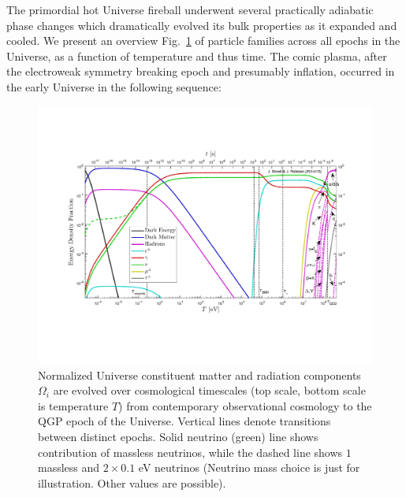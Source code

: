\documentclass[universe,article,submit,moreauthors,pdftex,a4paper]{Definitions/mdpi}
\newcommand*{\rf}[1]{Fig.~{\ref{#1}}}
\begin{document}
{The primordial hot Universe fireball underwent several practically adiabatic phase changes which dramatically evolved its bulk properties as it expanded and cooled.} We present an overview \rf{CosmicFraction} of particle families across all epochs in the Universe, as a function of temperature and thus time. The comic plasma, after the electroweak symmetry breaking epoch and presumably inflation, occurred in the early Universe in the following sequence:

\begin{figure}[ht]
 \centerline{\includegraphics[trim=70 120 60 100,clip,width=\textwidth,width=\linewidth]{./plots/energy_fractions.pdf}}
 \caption{Normalized  Universe constituent matter and radiation components $\Omega_i$ are evolved over cosmological timescales (top scale, bottom scale is temperature $T$) from contemporary observational cosmology to the QGP epoch of the Universe. Vertical lines denote transitions between distinct epochs. Solid neutrino (green) line shows contribution of massless neutrinos, while the dashed line shows $1$ massless and $2\times 0.1$ eV neutrinos (Neutrino mass choice is just for illustration. Other values are possible). \label{CosmicFraction}}
\end{figure}
\end{document}
